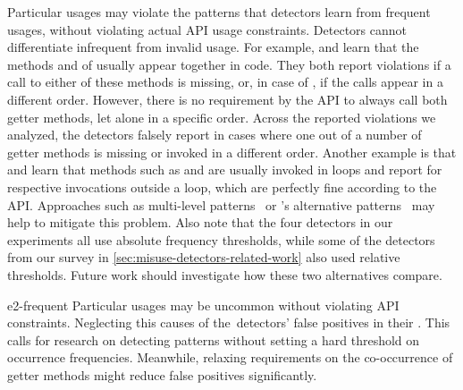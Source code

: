 \vspace{0.03in}
Particular usages may violate the patterns that detectors learn from frequent usages, without violating actual API usage constraints.
Detectors cannot differentiate infrequent from invalid usage.
For example, \DMMC and \Jadet learn that the methods  and  of  usually appear together in code.
They both report violations if a call to either of these methods is missing, or, in case of \Jadet, if the calls appear in a different order.
However, there is no requirement by the API to always call both getter methods, let alone in a specific order.
Across the reported violations we analyzed, the detectors falsely report  in cases where one out of a number of getter methods is missing or invoked in a different order.
%
Another example is that \Jadet and \Tikanga learn that methods such as  and  are usually invoked in loops and report  for respective invocations outside a loop, which are perfectly fine according to the API.
%
Approaches such as multi-level patterns~\cite{SBA+15} or \Alattin's alternative patterns~\cite{TX09b} may help to mitigate this problem.
Also note that the four detectors in our experiments all use absolute frequency thresholds, while some of the detectors from our survey in \autoref{sec:misuse-detectors-related-work} also used relative thresholds.
Future work should investigate how these two alternatives compare.

\begin{obs}{e2-frequent}
  Particular usages may be uncommon without violating API constraints.
  Neglecting this causes  of the~detectors' false positives in their .
%
This calls for research on detecting patterns without setting a hard threshold on occurrence frequencies.
%
Meanwhile, relaxing requirements on the co-occurrence of getter methods might reduce false positives significantly.
\end{obs}

